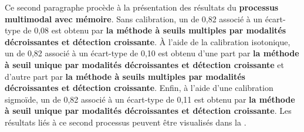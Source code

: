 Ce second paragraphe procède à la présentation des résultats du \textbf{processus multimodal avec mémoire}. Sans calibration, un \fscore{} de 0,82 associé à un écart-type de 0,08 est obtenu par \textbf{la méthode à seuils multiples par modalités décroissantes et détection croissante}. À l'aide de la calibration isotonique, un \fscore{} de 0,82 associé à un écart-type de 0,10 est obtenu d'une part par \textbf{la méthode à seuil unique par modalités décroissantes et détection croissante} et d'autre part par \textbf{la méthode à seuils multiples par modalités décroissantes et détection croissante}. Enfin, à l'aide d'une calibration sigmoïde, un \fscore{} de 0,82 associé à un écart-type de 0,11 est obtenu par \textbf{la méthode à seuil unique par modalités décroissantes et détection croissante}. Les résultats liés à ce second processus peuvent être visualisés dans la .\par

